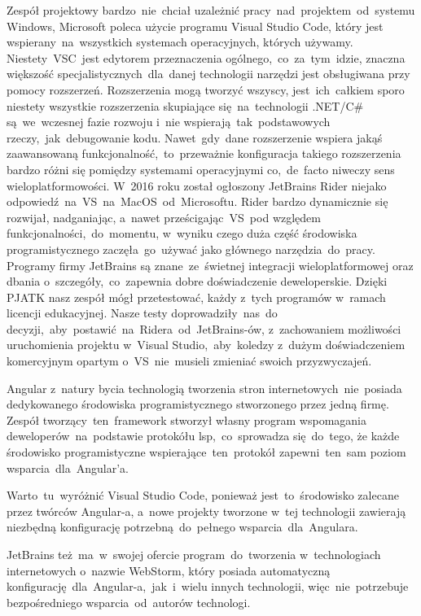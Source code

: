 \indent Zespół projektowy bardzo~nie~chciał uzależnić pracy~nad~projektem~od~systemu Windows, Microsoft poleca użycie programu Visual Studio Code, który jest wspierany~na~wszystkich systemach operacyjnych, których używamy.
Niestety~VSC~jest edytorem przeznaczenia ogólnego,~co~za~tym~idzie, znaczna większość specjalistycznych~dla~danej technologii narzędzi jest obsługiwana przy pomocy rozszerzeń.
Rozszerzenia mogą tworzyć wszyscy, jest~ich~całkiem sporo niestety wszystkie rozszerzenia skupiające się~na~technologii .NET/C\# są~we~wczesnej fazie rozwoju i~nie wspierają~tak~podstawowych rzeczy,~jak~debugowanie kodu.
Nawet~gdy~dane rozszerzenie wspiera jakąś zaawansowaną funkcjonalność,~to~przeważnie konfiguracja takiego rozszerzenia bardzo różni się pomiędzy systemami operacyjnymi co,~de~facto niweczy sens wieloplatformowości.
\indent W~2016 roku został ogłoszony JetBrains Rider niejako odpowiedź~na~VS~na~MacOS~od~Microsoftu.
Rider bardzo dynamicznie się rozwijał, nadganiając, a~nawet prześcigając~VS~pod względem funkcjonalności,~do~momentu, w~wyniku czego duża część środowiska programistycznego zaczęła~go~używać jako głównego narzędzia~do~pracy.
Programy firmy JetBrains są znane~ze~świetnej integracji wieloplatformowej oraz dbania o~szczegóły,~co~zapewnia dobre doświadczenie deweloperskie.\newline
\indent Dzięki PJATK nasz zespół mógł przetestować, każdy z~tych programów w~ramach licencji edukacyjnej.
Nasze testy doprowadziły~nas~do decyzji,~aby~postawić~na~Ridera~od~JetBrains-ów, z~zachowaniem możliwości uruchomienia projektu w~Visual Studio,~aby~koledzy z~dużym doświadczeniem komercyjnym opartym o~VS~nie~musieli zmieniać swoich przyzwyczajeń.

\indent Angular z~natury bycia technologią tworzenia stron internetowych~nie~posiada dedykowanego środowiska programistycznego stworzonego przez jedną firmę.
Zespół tworzący~ten~framework stworzył własny program wspomagania deweloperów~na~podstawie protokółu \acrshort{lsp},~co~sprowadza się~do~tego, że każde środowisko programistyczne wspierające~ten~protokół zapewni~ten~sam poziom wsparcia~dla~Angular'a.

\indent Warto~tu~wyróżnić Visual Studio Code, ponieważ jest~to~środowisko zalecane przez twórców Angular-a, a~nowe projekty tworzone w~tej technologii zawierają niezbędną konfigurację potrzebną~do~pełnego wsparcia~dla~Angulara.

JetBrains też~ma~w~swojej ofercie program~do~tworzenia w~technologiach internetowych o~nazwie WebStorm, który posiada automatyczną konfigurację~dla~Angular-a,~jak~i~wielu innych technologii, więc~nie~potrzebuje bezpośredniego wsparcia~od~autorów technologi.

